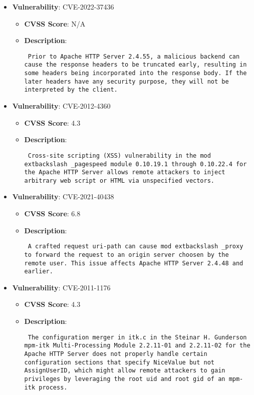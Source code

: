 \documentclass{article}
\begin{document}
\begin{itemize}
        \item \textbf{Vulnerability}: CVE-2022-37436
        \begin{itemize}
            \item \textbf{CVSS Score}:  N/A 
            \item \textbf{Description}: \parbox{\linewidth}{\texttt{ Prior to Apache HTTP Server 2.4.55, a malicious backend can cause the response headers to be truncated early, resulting in some headers being incorporated into the response body. If the later headers have any security purpose, they will not be interpreted by the client. }}
        \end{itemize}
    
        \item \textbf{Vulnerability}: CVE-2012-4360
        \begin{itemize}
            \item \textbf{CVSS Score}:  4.3 
            \item \textbf{Description}: \parbox{\linewidth}{\texttt{ Cross-site scripting (XSS) vulnerability in the mod	extbackslash _pagespeed module 0.10.19.1 through 0.10.22.4 for the Apache HTTP Server allows remote attackers to inject arbitrary web script or HTML via unspecified vectors. }}
        \end{itemize}
    
        \item \textbf{Vulnerability}: CVE-2021-40438
        \begin{itemize}
            \item \textbf{CVSS Score}:  6.8 
            \item \textbf{Description}: \parbox{\linewidth}{\texttt{ A crafted request uri-path can cause mod	extbackslash _proxy to forward the request to an origin server choosen by the remote user. This issue affects Apache HTTP Server 2.4.48 and earlier. }}
        \end{itemize}
    
        \item \textbf{Vulnerability}: CVE-2011-1176
        \begin{itemize}
            \item \textbf{CVSS Score}:  4.3 
            \item \textbf{Description}: \parbox{\linewidth}{\texttt{ The configuration merger in itk.c in the Steinar H. Gunderson mpm-itk Multi-Processing Module 2.2.11-01 and 2.2.11-02 for the Apache HTTP Server does not properly handle certain configuration sections that specify NiceValue but not AssignUserID, which might allow remote attackers to gain privileges by leveraging the root uid and root gid of an mpm-itk process. }}
        \end{itemize}
    

\end{itemize}
\end{document}
